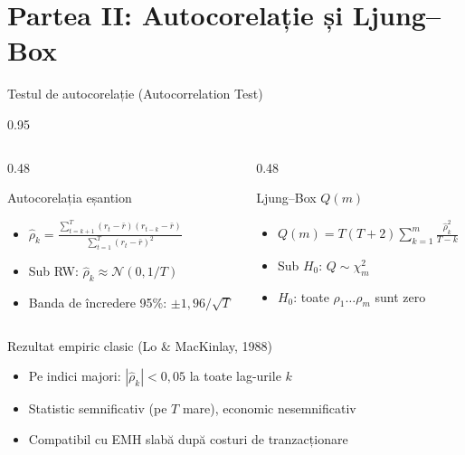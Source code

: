\documentclass[9pt, aspectratio=169, t]{beamer}
\begin{document}
\section{Partea II: Autocorelație și Ljung--Box}

\begin{frame}[shrink=15]{Testul de autocorelație (Autocorrelation Test)}
\begin{cminipage}{0.95\textwidth}
\begin{columns}[T]
\begin{column}{0.48\textwidth}
\begin{block}{Autocorelația eșantion}
\begin{itemize}\setlength{\itemsep}{0pt}
    \item $\hat\rho_k = \frac{\sum_{t=k+1}^{T}(r_t - \bar r)(r_{t-k} - \bar r)}{\sum_{t=1}^{T}(r_t - \bar r)^2}$
    \item Sub RW: $\hat\rho_k \approx \mathcal{N}(0, 1/T)$
    \item Banda de încredere 95\%: $\pm 1{,}96/\sqrt{T}$
\end{itemize}
\end{block}
\end{column}
\begin{column}{0.48\textwidth}
\begin{block}{Ljung--Box $Q(m)$}
\begin{itemize}\setlength{\itemsep}{0pt}
    \item $Q(m) = T(T+2)\sum_{k=1}^{m}\frac{\hat\rho_k^2}{T-k}$
    \item Sub $H_0$: $Q \sim \chi^2_m$
    \item $H_0$: toate $\rho_1 \ldots \rho_m$ sunt zero
\end{itemize}
\end{block}
\end{column}
\end{columns}

\vspace{0.15cm}
\begin{alertblock}{Rezultat empiric clasic (Lo \& MacKinlay, 1988)}
\begin{itemize}\setlength{\itemsep}{0pt}
    \item Pe indici majori: $|\hat\rho_k| < 0{,}05$ la toate lag-urile $k$
    \item Statistic semnificativ (pe $T$ mare), economic nesemnificativ
    \item Compatibil cu EMH slabă după costuri de tranzacționare
\end{itemize}
\end{alertblock}
\end{cminipage}
\end{frame}
\end{document}
